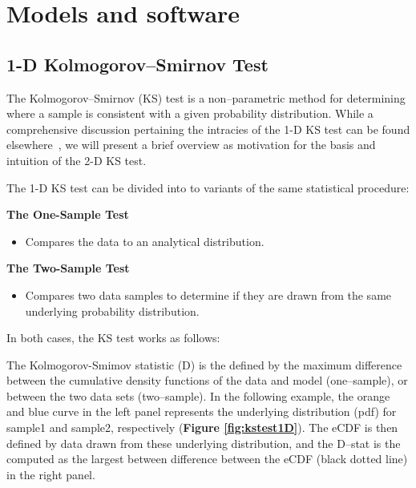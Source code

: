 \documentclass[codesnippet]{jss}
\begin{document}


\section{Models and software} \label{sec:models}

\subsection{1-D Kolmogorov--Smirnov Test}

The Kolmogorov--Smirnov (KS) test is a non--parametric method for determining where a sample is consistent with a given probability distribution. While a comprehensive discussion pertaining the intracies of the 1-D KS test can be found elsewhere~\citep{Stephens1992}, we will present a brief overview as motivation for the basis and intuition of the 2-D KS test.

The 1-D KS test can be divided into to variants of the same statistical procedure:

\begin{leftbar}
\textbf{The One-Sample Test}
\begin{itemize}
\item Compares the data to an analytical distribution.
\end{itemize}
\textbf{The Two-Sample Test}
\begin{itemize}
\item Compares two data samples to determine if they are drawn from the same underlying probability distribution.
\end{itemize}
\end{leftbar}

In both cases, the KS test works as follows:

The Kolmogorov-Smimov statistic (D) is the defined by the maximum difference between the cumulative density functions of the data and model (one--sample), or between the two data sets (two--sample). In the following example, the orange and blue curve in the left panel represents the underlying distribution (pdf) for sample1 and sample2, respectively (\textbf{Figure \ref{fig:kstest1D}}). The eCDF is then defined by data drawn from these underlying distribution, and the D--stat is the computed as the largest between difference between the eCDF (black dotted line) in the right panel.
\end{document}
